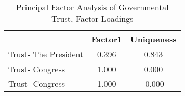 \begin{table}[htbp]\centering
\def\sym#1{\ifmmode^{#1}\else\(^{#1}\)\fi}
\caption{Principal Factor Analysis of Governmental Trust, Factor Loadings}
\begin{tabular}{l*{1}{cc}}
\hline\hline
                    &     Factor1&  Uniqueness\\
\hline
Trust- The President&       0.396&       0.843\\
Trust- Congress     &       1.000&       0.000\\
Trust- Congress     &       1.000&      -0.000\\
\hline\hline
\end{tabular}
\end{table}
